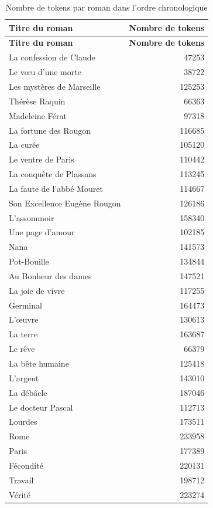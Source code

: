\documentclass{article}
\begin{document}
\begin{longtable}{p{8cm}r}
\caption{Nombre de tokens par roman dans l'ordre chronologique}  \\
\toprule
\textbf{Titre du roman} & \textbf{Nombre de tokens} \\
\midrule
\endfirsthead

\toprule
\textbf{Titre du roman} & \textbf{Nombre de tokens} \\
\midrule
\endhead

La confession de Claude & 47253 \\
Le vœu d'une morte & 38722 \\
Les mystères de Marseille & 125253 \\
Thérèse Raquin & 66363 \\
Madeleine Férat & 97318 \\
La fortune des Rougon & 116685 \\
La curée & 105120 \\
Le ventre de Paris & 110442 \\
La conquête de Plassans & 113245 \\
La faute de l'abbé Mouret & 114667 \\
Son Excellence Eugène Rougon & 126186 \\
L'assommoir & 158340 \\
Une page d'amour & 102185 \\
Nana & 141573 \\
Pot-Bouille & 134844 \\
Au Bonheur des dames & 147521 \\
La joie de vivre & 117255 \\
Germinal & 164473 \\
L'œuvre & 130613 \\
La terre & 163687 \\
Le rêve & 66379 \\
La bête humaine & 125418 \\
L'argent & 143010 \\
La débâcle & 187046 \\
Le docteur Pascal & 112713 \\
Lourdes & 173511 \\
Rome & 233958 \\
Paris & 177389 \\
Fécondité & 220131 \\
Travail & 198712 \\
Vérité & 223274 \\

\bottomrule
\end{longtable}
\end{document}
